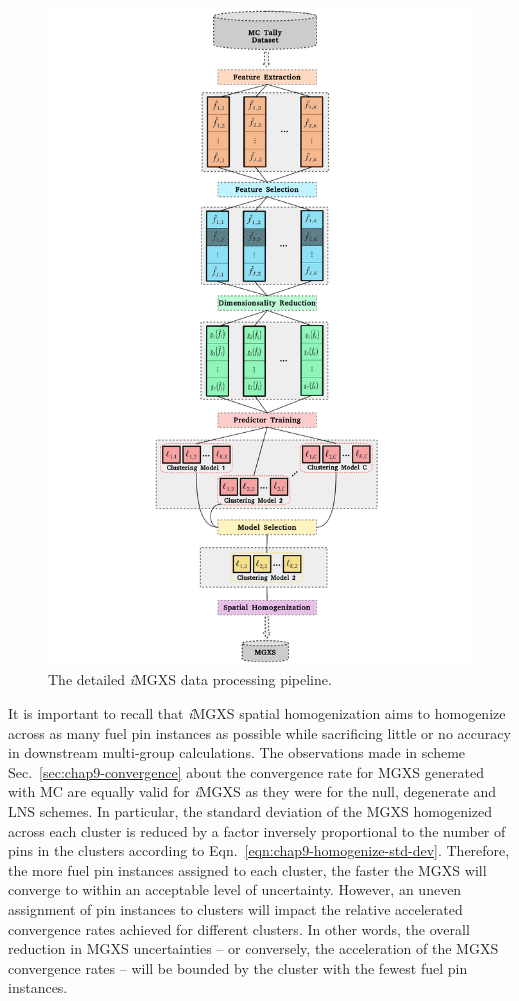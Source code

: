 \begin{figure}[h!]
\centering
\includegraphics[width=0.9\linewidth]{figures/unsupervised/features/engineering/flow-chart}
\vspace{2mm}
\caption[\textit{i}MGXS flow chart]{The detailed \textit{i}\ac{MGXS} data processing pipeline.}
\label{fig:chap10-imgxs-pipeline}
\end{figure}

It is important to recall that \textit{i}\ac{MGXS} spatial homogenization aims to homogenize across as many fuel pin instances as possible while sacrificing little or no accuracy in downstream multi-group calculations. The observations made in scheme Sec.~\ref{sec:chap9-convergence} about the convergence rate for \ac{MGXS} generated with \ac{MC} are equally valid for \textit{i}\ac{MGXS} as they were for the null, degenerate and \ac{LNS} schemes. In particular, the standard deviation of the \ac{MGXS} homogenized across each cluster is reduced by a factor inversely proportional to the number of pins in the clusters according to Eqn.~\ref{eqn:chap9-homogenize-std-dev}. Therefore, the more fuel pin instances assigned to each cluster, the faster the \ac{MGXS} will converge to within an acceptable level of uncertainty. However, an uneven assignment of pin instances to clusters will impact the relative accelerated convergence rates achieved for different clusters. In other words, the overall reduction in \ac{MGXS} uncertainties -- or conversely, the acceleration of the \ac{MGXS} convergence rates -- will be bounded by the cluster with the fewest fuel pin instances.

